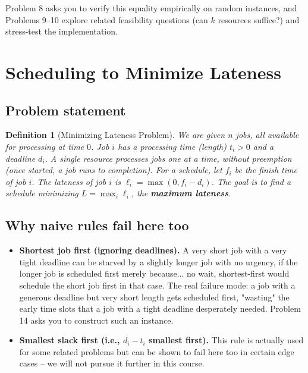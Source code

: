 \documentclass[11pt]{article}
\newtheorem{definition}[theorem]{Definition}
\begin{document}
Problem 8 asks you to verify this equality empirically on random instances, and Problems
9--10 explore related feasibility questions (can $k$ resources suffice?) and stress-test
the implementation.

\section{Scheduling to Minimize Lateness}

\subsection{Problem statement}

\begin{definition}[Minimizing Lateness Problem]
We are given $n$ jobs, all available for processing at time $0$. Job $i$ has a
\emph{processing time} (length) $t_i > 0$ and a \emph{deadline} $d_i$. A single resource
processes jobs one at a time, without preemption (once started, a job runs to
completion). For a schedule, let $f_i$ be the finish time of job $i$. The
\emph{lateness} of job $i$ is $\ell_i = \max(0, f_i - d_i)$. The goal is to find a
schedule minimizing $L = \max_i \ell_i$, the \textbf{maximum lateness}.
\end{definition}

\subsection{Why naive rules fail here too}

\begin{itemize}
    \item \textbf{Shortest job first (ignoring deadlines).} A very short job with a very
    tight deadline can be starved by a slightly longer job with no urgency, if the longer
    job is scheduled first merely because... no wait, shortest-first would schedule the
    short job first in that case. The real failure mode: a job with a generous deadline
    but very short length gets scheduled first, "wasting" the early time slots that a job
    with a tight deadline desperately needed. Problem 14 asks you to construct such an
    instance.
    \item \textbf{Smallest slack first (i.e., $d_i - t_i$ smallest first).} This rule is
    actually used for some related problems but can be shown to fail here too in certain
    edge cases -- we will not pursue it further in this course.
\end{itemize}
\end{document}
